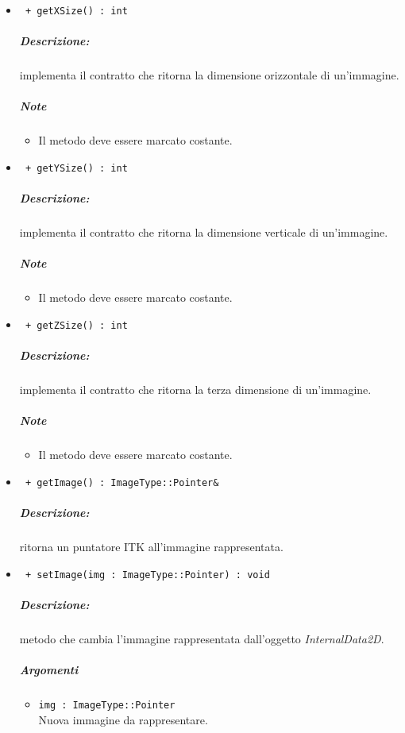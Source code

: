 \begin{itemize}
		\item \color{blue}\verb! + getXSize() : int !\\
		\color{black} 
		\subparagraph{Descrizione:} implementa il contratto che ritorna la dimensione orizzontale di un'immagine.
		\subparagraph{Note}
			\begin{itemize}
				\item Il metodo deve essere marcato costante.
			\end{itemize}
		
		\item \color{blue}\verb! + getYSize() : int !\\
		\color{black}
		\subparagraph{Descrizione:} implementa il contratto che ritorna la dimensione verticale di un'immagine.
		\subparagraph{Note}
			\begin{itemize}
				\item Il metodo deve essere marcato costante.
			\end{itemize}
			
		\item \color{blue}\verb! + getZSize() : int !\\
		\color{black}
		\subparagraph{Descrizione:} implementa il contratto che ritorna la terza dimensione di un'immagine.
		\subparagraph{Note}
			\begin{itemize}
				\item Il metodo deve essere marcato costante.
			\end{itemize}
			
	\item \color{blue}\verb! + getImage() : ImageType::Pointer& !\\
	\color{black}
	\subparagraph{Descrizione:} ritorna un puntatore ITK\g{} all'immagine rappresentata.
			
	\item \color{blue}\verb! + setImage(img : ImageType::Pointer) : void!\\
	\color{black}
	\subparagraph{Descrizione:} metodo che cambia l'immagine rappresentata dall'oggetto \textsl{InternalData2D}.
	\subparagraph{Argomenti}
		\begin{itemize}
			\item \color{RoyalPurple}\verb!img : ImageType::Pointer!\\
			\color{black}
			Nuova immagine da rappresentare.
		\end{itemize}
		

\end{itemize}
